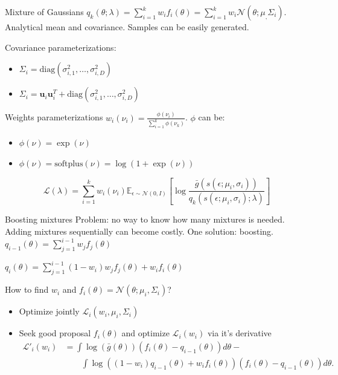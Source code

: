 \documentclass{beamer}
\def \Ev {{\mathbb E}}
\def \u {{\mathbf u}}
\def \gu {{\bar{g}}}
\begin{document}
\begin{frame}{}
\begin{block}{Mixture of Gaussians}
$q_k(\theta;\lambda) = \sum_{i=1}^k w_i f_i(\theta) = \sum_{i=1}^k w_i \mathcal{N}(\theta;\mu_,\Sigma_i)$. Analytical mean and covariance. Samples can be easily generated.

Covariance parameterizations: 
\begin{itemize}
\item $\Sigma_i = \text{diag}(\sigma_{i,1}^2,\ldots,\sigma_{i,D}^2)$
\item $\Sigma_i = \u_i \u_i^T + \text{diag}(\sigma_{i,1}^2,\ldots,\sigma_{i,D}^2)$
\end{itemize}

Weights parameterizations $w_i(\nu_i) = \frac{\phi(\nu_i)}{\sum_{i=1}^k \phi(\nu_k)}$. $\phi$ can be:
\begin{itemize}
\item $\phi(\nu) = \exp(\nu)$
\item $\phi(\nu) = \text{softplus}(\nu) = \log(1+\exp(\nu))$
\end{itemize}
\begin{equation*}
\mathcal{L}(\lambda) = \sum_{i=1}^k w_i(\nu_i) \Ev_{\epsilon \sim \mathcal{N}(0,I)}\left[\log \frac{ \gu(s(\epsilon;\mu_i,\sigma_i))}{q_k(s(\epsilon;\mu_i,\sigma_i);\lambda)}\right]
\end{equation*}

\end{block}
\end{frame}

\begin{frame}{}
\begin{block}{Boosting mixtures}
Problem: no way to know how many mixtures is needed. Adding mixtures sequentially can become costly. One solution: boosting.
$q_{i-1}(\theta) = \sum_{j=1}^{i-1} w_j f_j(\theta)$

$q_{i}(\theta) = \sum_{j=1}^{i-1} (1-w_{i}) w_j f_j(\theta) + w_{i} f_i(\theta)$

How to find $w_{i}$ and $f_i(\theta) = \mathcal{N}(\theta;\mu_{i},\Sigma_{i})$?
\begin{itemize}
\item Optimize jointly $\mathcal{L}_{i}(w_{i},\mu_{i},\Sigma_{i})$
\item Seek good proposal $f_i(\theta)$ and optimize $\mathcal{L}_{i}(w_{i})$ via it's derivative
\begin{equation*}
\begin{split}
\mathcal{L}'_{i}(w_{i}) & = \int \log (\gu(\theta)) (f_{i}(\theta) - q_{i-1}(\theta)) d\theta - \\
& \qquad{} \int \log((1-w_{i}) q_{i-1}(\theta) + w_{i} f_{i}(\theta)) (f_i(\theta) - q_{i-1}(\theta)) d\theta.
\end{split}
\end{equation*}
\end{itemize}
\end{block}
\end{frame}
\end{document}
